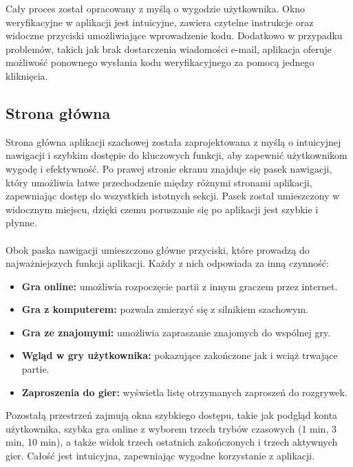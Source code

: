 \documentclass[12pt,a4paper]{article}
\begin{document}
\noindent
Cały proces został opracowany z myślą o wygodzie użytkownika. Okno weryfikacyjne w aplikacji jest intuicyjne, zawiera czytelne instrukcje oraz widoczne przyciski umożliwiające wprowadzenie kodu. Dodatkowo w przypadku problemów, takich jak brak dostarczenia wiadomości e-mail, aplikacja oferuje możliwość ponownego wysłania kodu weryfikacyjnego za pomocą jednego kliknięcia.

\newpage

\subsection{Strona główna}
Strona główna aplikacji szachowej została zaprojektowana z myślą o intuicyjnej nawigacji i szybkim dostępie do kluczowych funkcji, aby zapewnić użytkownikom wygodę i efektywność. Po prawej stronie ekranu znajduje się pasek nawigacji, który umożliwia łatwe przechodzenie między różnymi stronami aplikacji, zapewniając dostęp do wszystkich istotnych sekcji. Pasek został umieszczony w widocznym miejscu, dzięki czemu poruszanie się po aplikacji jest szybkie i płynne.
\\\\
Obok paska nawigacji umieszczono główne przyciski, które prowadzą do najważniejszych funkcji aplikacji. Każdy z nich odpowiada za inną czynność:

\begin{itemize}
    \item \textbf{Gra online:} umożliwia rozpoczęcie partii z innym graczem przez internet.
    \item \textbf{Gra z komputerem:} pozwala zmierzyć się z silnikiem szachowym.
    \item \textbf{Gra ze znajomymi:} umożliwia zapraszanie znajomych do wspólnej gry.
    \item \textbf{Wgląd w gry użytkownika:} pokazujące zakończone jak i wciąż trwające partie.
    \item \textbf{Zaproszenia do gier:} wyświetla listę otrzymanych zaproszeń do rozgrywek.
\end{itemize}

\noindent
Pozostałą przestrzeń zajmują okna szybkiego dostępu, takie jak podgląd konta użytkownika, szybka gra online z wyborem trzech trybów czasowych (1 min, 3 min, 10 min), a także widok trzech ostatnich zakończonych i trzech aktywnych gier. Całość jest intuicyjna, zapewniając wygodne korzystanie z aplikacji.
\end{document}
